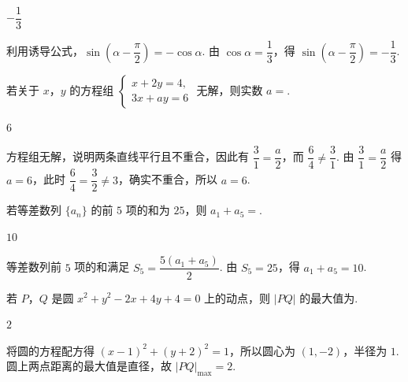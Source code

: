 \begin{answer}
\(-\dfrac13\)
\end{answer}

\begin{solution}
利用诱导公式，\(\sin\left(\alpha-\dfrac{\pi}{2}\right)=-\cos\alpha\). 由 \(\cos\alpha=\dfrac13\)，得 \(\sin\left(\alpha-\dfrac{\pi}{2}\right)=-\dfrac13\).
\end{solution}

\begin{problem}
若关于 \(x\)，\(y\) 的方程组 \(\begin{cases}
x+2y=4,\\
3x+ay=6
\end{cases}\)
无解，则实数 \(a=\)\fillinblank{}.
\end{problem}

\begin{answer}
\(6\)
\end{answer}

\begin{solution}
方程组无解，说明两条直线平行且不重合，因此有 \(\dfrac31=\dfrac a2\)，而 \(\dfrac64\ne\dfrac31\). 由 \(\dfrac31=\dfrac a2\) 得 \(a=6\)，此时 \(\dfrac64=\dfrac32\ne3\)，确实不重合，所以 \(a=6\).
\end{solution}

\begin{problem}
若等差数列 \(\{a_n\}\) 的前 \(5\) 项的和为 \(25\)，则 \(a_1+a_5=\)\fillinblank{}.
\end{problem}

\begin{answer}
\(10\)
\end{answer}

\begin{solution}
等差数列前 \(5\) 项的和满足 \(S_5=\dfrac{5(a_1+a_5)}2\). 由 \(S_5=25\)，得 \(a_1+a_5=10\).
\end{solution}

\begin{problem}
若 \(P\)，\(Q\) 是圆 \(x^2+y^2-2x+4y+4=0\) 上的动点，则 \(\lvert PQ\rvert\) 的最大值为\fillinblank{}.
\end{problem}

\begin{answer}
\(2\)
\end{answer}

\begin{solution}
将圆的方程配方得 \((x-1)^2+(y+2)^2=1\)，所以圆心为 \((1,-2)\)，半径为 \(1\). 圆上两点距离的最大值是直径，故 \(\lvert PQ\rvert_{\max}=2\).
\end{solution}

